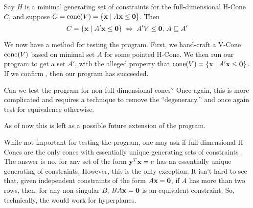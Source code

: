 \begin{EqCriteria}\label{eq_vc_hc}
	Say $H$ is a minimal generating set of constraints for the full-dimensional H-Cone $C$, and suppose $C = \operatorname{cone}(V) = \left\{\mathbf{x}\;|\; A\mathbf{x}\leq\mathbf{0}\right\}$.  Then
	\[ C = \left\{\mathbf{x}\;|\; A'\mathbf{x}\leq\mathbf{0}\right\} \;\Leftrightarrow\; A'V\leq\mathbf{0},\, A \sqsubseteq A' \]
\end{EqCriteria}

\begin{Test}\label{test_vc_to_hc}
	We now have a method for testing the program.  First, we hand-craft a V-Cone $\operatorname{cone}(V)$ based on minimal set $A$ for some pointed H-Cone. We then run our program to get a set $A'$, with the alleged property that $\operatorname{cone}(V) = \left\{\mathbf{x}\;|\; A'\mathbf{x}\leq\mathbf{0}\right\}$.  If we confirm , then our program has succeeded.
\end{Test}

\begin{Remark}
	Can we test the program for non-full-dimensional cones?  Once again, this is more complicated and requires a technique to remove the ``degeneracy,'' and once again test for equivalence otherwise.

	As of now this is left as a possible future extension of the program.
\end{Remark}

\begin{Remark}
	While not important for testing the program, one may ask if full-dimensional H-Cones are the only cones with essentially unique generating sets of constraints .  The answer is no, for any set of the form $\mathbf{y}^T \mathbf{x} = c$ has an essentially unique generating of constraints.  However, this is the only exception.  It isn't hard to see that, given independent constraints of the form $A\mathbf{x}=\mathbf{0}$, if $A$ has more than two rows, then, for any non-singular $B$, $BA\mathbf{x}=\mathbf{0}$ is an equivalent constraint.  So, technically, the  would work for hyperplanes.
\end{Remark}

